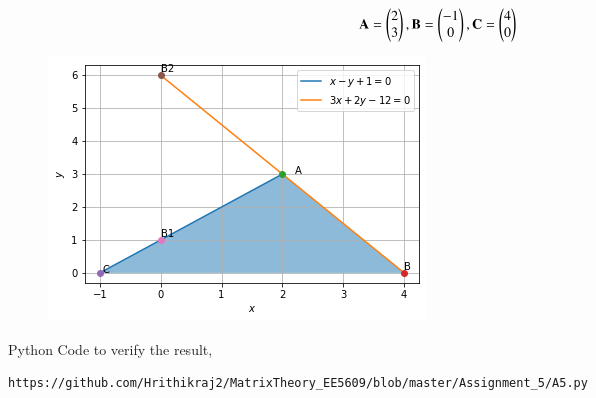 \documentclass[journal,12pt,twocolumn]{IEEEtran}
\begin{document}
\begin{align}
    \mathbf{A} = \begin{pmatrix}2 \\ 3\end{pmatrix}, \mathbf{B} = \begin{pmatrix}-1 \\ 0\end{pmatrix}, \mathbf{C} = \begin{pmatrix}4 \\ 0\end{pmatrix}
\end{align}
\begin{figure}[!ht]
\centering
\includegraphics[width=\columnwidth]{A5.png}
\caption{}
\label{Fig:1}
\end{figure}
Python Code to verify the result, 
\begin{lstlisting}
https://github.com/Hrithikraj2/MatrixTheory_EE5609/blob/master/Assignment_5/A5.py
\end{lstlisting}
\end{document}
